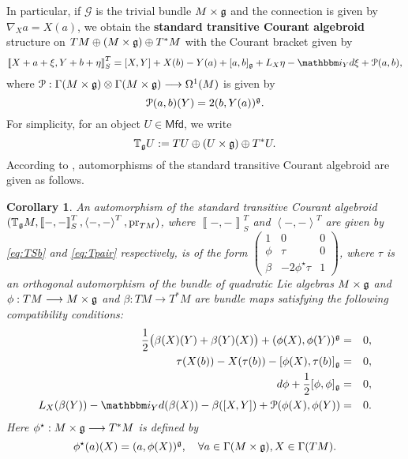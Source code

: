 \documentclass[letterpaper,10pt, oneside]{article} %
\newtheorem{cor}[thm]{Corollary}
\newcommand{\Mfd}{\mathsf{Mfd}}%
\newcommand{\tagu}{{\mathbb{T}_\g U}}
\newcommand{\tagof}[1]{\mathbb{T}_\g {#1}}
\newcommand{\ii}{\mathbbm i}
\newcommand{\huaG}{\mathcal{G}}
\newcommand{\huaP}{\mathcal{P}}
\newcommand{\half}{\frac{1}{2}}
\newcommand{\pair}[1]{\left\langle #1\right\rangle}
\newcommand{\Courant}[1]{\left\llbracket  #1\right\rrbracket }
\newcommand{\pr}{\mathrm{pr}}
\begin{document}

In particular, if $\huaG$ is the trivial bundle $M\times\mathfrak g$ and the connection is given by $\nabla_Xa=X(a)$, we obtain the {\bf standard transitive Courant algebroid} structure on $TM\oplus (M\times \mathfrak g)\oplus T^*M$ with the Courant bracket given by
\begin{equation}\label{eq:TSb}
 \Courant{X+a+\xi,Y+b+\eta}^T_S=[X,Y]+ X(b)-Y(a)+[a,b]_\g+L_X\eta-\ii_Yd\xi+\huaP(a,b),
\end{equation}
where $\huaP:\Gamma(M\times \g)\otimes \Gamma(M\times \g)\longrightarrow\Omega^1(M)$ is given by
$$
 \huaP(a,b)(Y)=2(b,Y(a))^\g.
$$For simplicity, for an object $U\in \Mfd$, we write
\[\tagu := TU\oplus(U\times \g)\oplus T^*U.\]
According to \cite[Proposition 2.7]{ChenRCA}, automorphisms of the standard transitive Courant algebroid are given as follows.

\begin{cor}\label{pro:auto}
  An automorphism of the standard transitive Courant algebroid $(\tagof{M},\Courant{-,-}^T_S,\pair{-,-}^T,\pr_{TM})$, where $\Courant{-,-}^T_S$ and $\pair{-,-}^T$ are given by \eqref{eq:TSb} and \eqref{eq:Tpair} respectively,  is of the form $\left(\begin{array}{ccc}
1&0&0\\
\phi&\tau&0\\
\beta&-2\phi^\star\tau&1
\end{array}\right)$, where $\tau$ is an orthogonal automorphism of the bundle of quadratic Lie algebras $M\times \mathfrak g$ and $\phi:TM\longrightarrow M\times \mathfrak g$ and $\beta:TM\longrightarrow T^*M$ are bundle maps satisfying the following compatibility conditions:
\begin{eqnarray}
  \label{eq:auto1}\half\big(\beta(X)(Y)+\beta(Y)(X)\big)+(\phi(X),\phi(Y))^\g&=&0,\\
   \label{eq:auto2}\tau(X(b))-X(\tau(b))-[\phi(X),\tau(b)]_\g&=&0,\\
   \label{eq:auto3}d\phi+\half[\phi,\phi]_\g&=&0,\\
   \label{eq:auto4}L_X(\beta(Y))-\ii_Yd(\beta(X))-\beta([X,Y])+\huaP(\phi(X),\phi(Y))&=&0.
\end{eqnarray}
Here $\phi^\star:M\times\mathfrak g\longrightarrow T^*M$ is defined by
\begin{equation}\label{eq:star}
    \phi^\star(a)(X)=(a,\phi(X))^\mathfrak g,\quad \forall a\in\Gamma(M\times \mathfrak g), X\in\Gamma(TM).
\end{equation}
\end{cor}
\end{document}
